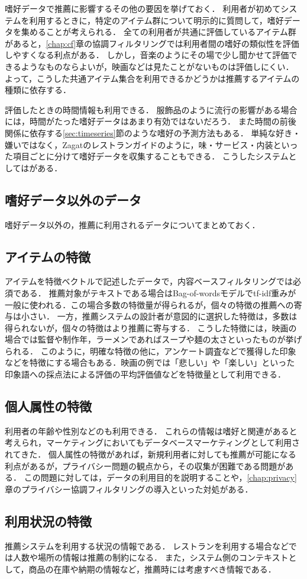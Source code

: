 嗜好データで推薦に影響するその他の要因を挙げておく．
利用者が初めてシステムを利用するときに，特定のアイテム群について明示的に質問して，嗜好データを集めることが考えられる．
全ての利用者が共通に評価しているアイテム群があると，\ref{chap:cf}章の協調フィルタリングでは利用者間の嗜好の類似性を評価しやすくなる利点がある．
しかし，音楽のようにその場で少し聞かせて評価できるようなものならよいが，映画などは見たことがないものは評価しにくい．
よって，こうした共通アイテム集合を利用できるかどうかは推薦するアイテムの種類に依存する．

評価したときの時間情報も利用できる．
服飾品のように流行の影響がある場合には，時間がたった嗜好データはあまり有効ではないだろう．
また時間の前後関係に依存する\ref{sec:timeseries}節のような嗜好の予測方法もある．
単純な好き・嫌いではなく，Zagatのレストランガイドのように，味・サービス・内装といった項目ごとに分けて嗜好データを収集することもできる．
こうしたシステムとしては\cite{ieeem:07:02}がある．

\subsection{嗜好データ以外のデータ}
\label{sec:featuredata}

嗜好データ以外の，推薦に利用されるデータについてまとめておく．

\subsection{アイテムの特徴}

アイテムを特徴ベクトルで記述したデータで，内容ベースフィルタリングでは必須である．
推薦対象がテキストである場合はBag-of-wordsモデルでtf-idf重み\cite{jb:012:00}が一般に使われる．この場合多数の特徴量が得られるが，個々の特徴の推薦への寄与は小さい．
一方，推薦システムの設計者が意図的に選択した特徴は，多数は得られないが，個々の特徴はより推薦に寄与する．
こうした特徴には，映画の場合では監督や制作年，ラーメンであればスープや麺の太さといったものが挙げられる．
このように，明確な特徴の他に，アンケート調査などで獲得した印象などを特徴にする場合もある．映画の例では「悲しい」や「楽しい」といった印象語への採点法による評価の平均評価値などを特徴量として利用できる．

\subsection{個人属性の特徴}

利用者の年齢や性別などのも利用できる\cite{ej:050}．
これらの情報は嗜好と関連があると考えられ，マーケティングにおいてもデータベースマーケティングとして利用されてきた\cite{dmkd:01:01}．
個人属性の特徴があれば，新規利用者に対しても推薦が可能になる利点があるが，プライバシー問題の観点から，その収集が困難である問題がある．
この問題に対しては，データの利用目的を説明すること\cite{sigir:01:01}や，\ref{chap:privacy}章のプライバシー協調フィルタリングの導入といった対処がある．

\subsection{利用状況の特徴}

推薦システムを利用する状況の情報である．
レストランを利用する場合などでは人数や場所の情報は推薦の制約になる\cite{tjsai:06:01,trjsai:06:01}．
また，システム側のコンテキストとして，商品の在庫や納期の情報など，推薦時には考慮すべき情報である．
